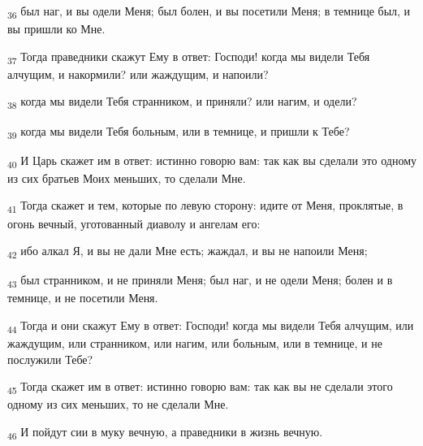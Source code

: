 \begin{tcolorbox}
\textsubscript{36} был наг, и вы одели Меня; был болен, и вы посетили Меня; в темнице был, и вы пришли ко Мне.
\end{tcolorbox}
\begin{tcolorbox}
\textsubscript{37} Тогда праведники скажут Ему в ответ: Господи! когда мы видели Тебя алчущим, и накормили? или жаждущим, и напоили?
\end{tcolorbox}
\begin{tcolorbox}
\textsubscript{38} когда мы видели Тебя странником, и приняли? или нагим, и одели?
\end{tcolorbox}
\begin{tcolorbox}
\textsubscript{39} когда мы видели Тебя больным, или в темнице, и пришли к Тебе?
\end{tcolorbox}
\begin{tcolorbox}
\textsubscript{40} И Царь скажет им в ответ: истинно говорю вам: так как вы сделали это одному из сих братьев Моих меньших, то сделали Мне.
\end{tcolorbox}
\begin{tcolorbox}
\textsubscript{41} Тогда скажет и тем, которые по левую сторону: идите от Меня, проклятые, в огонь вечный, уготованный диаволу и ангелам его:
\end{tcolorbox}
\begin{tcolorbox}
\textsubscript{42} ибо алкал Я, и вы не дали Мне есть; жаждал, и вы не напоили Меня;
\end{tcolorbox}
\begin{tcolorbox}
\textsubscript{43} был странником, и не приняли Меня; был наг, и не одели Меня; болен и в темнице, и не посетили Меня.
\end{tcolorbox}
\begin{tcolorbox}
\textsubscript{44} Тогда и они скажут Ему в ответ: Господи! когда мы видели Тебя алчущим, или жаждущим, или странником, или нагим, или больным, или в темнице, и не послужили Тебе?
\end{tcolorbox}
\begin{tcolorbox}
\textsubscript{45} Тогда скажет им в ответ: истинно говорю вам: так как вы не сделали этого одному из сих меньших, то не сделали Мне.
\end{tcolorbox}
\begin{tcolorbox}
\textsubscript{46} И пойдут сии в муку вечную, а праведники в жизнь вечную.
\end{tcolorbox}

